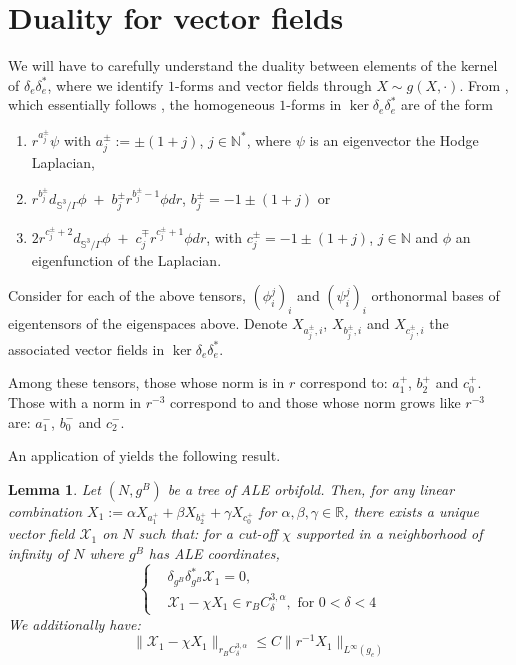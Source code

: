 \documentclass[11pt,reqno]{amsart}
\numberwithin{equation}{section}
\newtheorem{lem}[thm]{Lemma}
\theoremstyle{definition}
\theoremstyle{remark}
\begin{document}
\section{Duality for vector fields}\label{sec:duality vect fields}

We will have to carefully understand the duality between elements of the kernel of $\delta_{e}\delta_{e}^*$, where we identify $1$-forms and vector fields through $X\sim g(X,\cdot)$. From \cite[Section 3.1]{ozu2}, which essentially follows \cite[Section 2]{ct}, the homogeneous $1$-forms in $\ker\delta_{e}\delta_{e}^*$ are of the form
\begin{enumerate}
    \item $r^{a^\pm_j}\psi$ with $a^\pm_j:= \pm (1+j)$, $j\in \mathbb{N}^*$, where $\psi$ is an eigenvector the Hodge Laplacian,
    \item $r^{b^{\pm}_j}d_{\mathbb{S}^3\slash\Gamma}\phi \;+\; b^\pm_j r^{b^\pm_j-1}\phi dr$, $b_j^\pm = -1 \pm (1+j)$ or 
    \item $2r^{c^{\pm}_j+2}d_{\mathbb{S}^3\slash\Gamma}\phi \;+\; c^\mp_j r^{c^\pm_j+1}\phi dr$, with $c_j^\pm = -1 \pm (1+j)$, $j\in \mathbb{N}$ and $\phi$ an eigenfunction of the Laplacian.
\end{enumerate}
Consider for each of the above tensors, $(\phi_i^j)_i$ and $(\psi_i^j)_i$ orthonormal bases of eigentensors of the eigenspaces above. Denote $X_{a_j^\pm,i}$, $X_{b_j^\pm,i}$ and $X_{c_j^\pm,i}$ the associated vector fields in $\ker \delta_e\delta_e^*$.

Among these tensors, those whose norm is in $r$ correspond to: $a_1^+$, $b_2^+$ and $c^+_0$. Those with a norm in $r^{-3}$ correspond to
and those whose norm grows like $r^{-3}$ are: $a_1^-$, $b_0^-$ and $c^-_2$.

An application of \cite[Lemma 3.4]{ozu2} yields the following result.
\begin{lem}\label{lem harmonic vect field linear}
    Let $(N,g^B)$ be a tree of ALE orbifold. Then, for any linear combination $X_1:=\alpha X_{a_1^+} + \beta X_{b_2^+} + \gamma X_{c_0^+}$ for $\alpha,\beta,\gamma\in\mathbb{R}$, there exists a unique vector field $\mathcal{X}_1$ on $N$ such that: for a cut-off $\chi$ supported in a neighborhood of infinity of $N$ where $g^B$ has ALE coordinates,
    \begin{equation}
        \left\{\begin{aligned}
            &\delta_{g^B}\delta_{g^B}^*\mathcal{X}_1 = 0,\\
            &\mathcal{X}_1-\chi X_1\in r_BC^{3,\alpha}_{\delta}, \text{ for } 0<\delta<4
        \end{aligned}\right.
    \end{equation}
    We additionally have:
    \begin{equation}\label{eq:control X1}
        \|\mathcal{X}_1-\chi X_1\|_{r_BC^{3,\alpha}_{\delta}}\leqslant C \|r^{-1}X_1\|_{L^\infty(g_{e})}
    \end{equation}
\end{lem}
\end{document}
